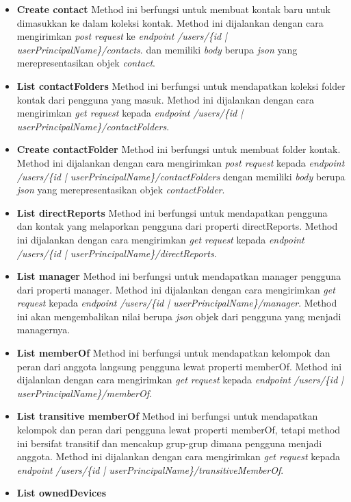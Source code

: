 \begin{itemize}
	\item \textbf{Create contact}
	Method ini berfungsi untuk membuat kontak baru untuk dimasukkan ke dalam koleksi kontak. Method ini dijalankan dengan cara mengirimkan \textit{post request} ke \textit{endpoint} \textit{/users/\{id | userPrincipalName\}/contacts}. dan memiliki \textit{body} berupa \textit{json} yang merepresentasikan objek \textit{contact}. 
	\item \textbf{List contactFolders}
	Method ini berfungsi untuk mendapatkan koleksi folder kontak dari pengguna yang masuk. Method ini dijalankan dengan cara mengirimkan \textit{get request} kepada \textit{endpoint} \textit{/users/\{id | userPrincipalName\}/contactFolders}. 
	\item \textbf{Create contactFolder}
	Method ini berfungsi untuk membuat folder kontak. Method ini dijalankan dengan cara mengirimkan \textit{post request} kepada \textit{endpoint} \textit{/users/\{id | userPrincipalName\}/contactFolders} dengan memiliki \textit{body} berupa \textit{json} yang merepresentasikan objek \textit{contactFolder}. 
	\item \textbf{List directReports}
	Method ini berfungsi untuk mendapatkan pengguna dan kontak yang melaporkan pengguna dari properti directReports. Method ini dijalankan dengan cara mengirimkan \textit{get request} kepada \textit{endpoint} \textit{/users/\{id | userPrincipalName\}/directReports}.
	\item \textbf{List manager}
	Method ini berfungsi untuk mendapatkan manager pengguna dari properti manager. Method ini dijalankan dengan cara mengirimkan \textit{get request} kepada \textit{endpoint} \textit{/users/\{id | userPrincipalName\}/manager}. Method ini akan mengembalikan nilai berupa \textit{json} objek dari pengguna yang menjadi managernya. 
	\item \textbf{List memberOf}
	Method ini berfungsi untuk mendapatkan kelompok dan peran dari anggota langsung pengguna lewat properti memberOf. Method ini dijalankan dengan cara mengirimkan \textit{get request} kepada \textit{endpoint} \textit{/users/\{id | userPrincipalName\}/memberOf}.
	\item \textbf{List transitive memberOf}
	Method ini berfungsi untuk mendapatkan kelompok dan peran dari pengguna lewat properti memberOf, tetapi method ini bersifat transitif dan mencakup grup-grup dimana pengguna menjadi anggota. Method ini dijalankan dengan cara mengirimkan \textit{get request} kepada \textit{endpoint} \textit{/users/\{id | userPrincipalName\}/transitiveMemberOf}.
	\item \textbf{List ownedDevices}

\end{itemize}

